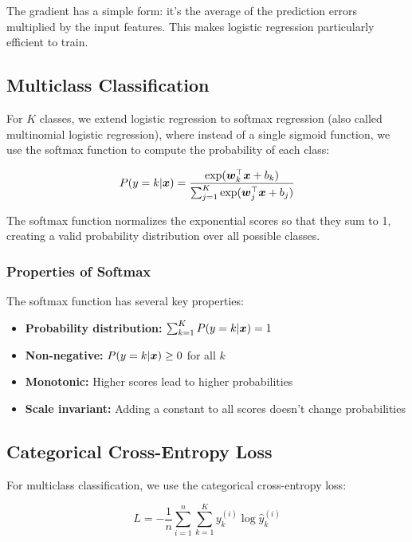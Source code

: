 \begin{remark}
The gradient has a simple form: it's the average of the prediction errors multiplied by the input features. This makes logistic regression particularly efficient to train.
\end{remark}

\subsection{Multiclass Classification}

For $K$ classes, we extend logistic regression to softmax regression (also called multinomial logistic regression), where instead of a single sigmoid function, we use the softmax function to compute the probability of each class:

\begin{equation}
P(y=k|\boldsymbol{x}) = \frac{\exp(\boldsymbol{w}_k^\top \boldsymbol{x} + b_k)}{\sum_{j=1}^{K} \exp(\boldsymbol{w}_j^\top \boldsymbol{x} + b_j)}
\end{equation}

The softmax function normalizes the exponential scores so that they sum to 1, creating a valid probability distribution over all possible classes.

\subsubsection{Properties of Softmax}

The softmax function has several key properties:
\begin{itemize}
    \item \textbf{Probability distribution:} $\sum_{k=1}^{K} P(y=k|\boldsymbol{x}) = 1$
    \item \textbf{Non-negative:} $P(y=k|\boldsymbol{x}) \geq 0$ for all $k$
    \item \textbf{Monotonic:} Higher scores lead to higher probabilities
    \item \textbf{Scale invariant:} Adding a constant to all scores doesn't change probabilities
\end{itemize}

\subsection{Categorical Cross-Entropy Loss}

For multiclass classification, we use the categorical cross-entropy loss:

\begin{equation}
L = -\frac{1}{n} \sum_{i=1}^{n} \sum_{k=1}^{K} y_k^{(i)} \log \hat{y}_k^{(i)}
\end{equation}

